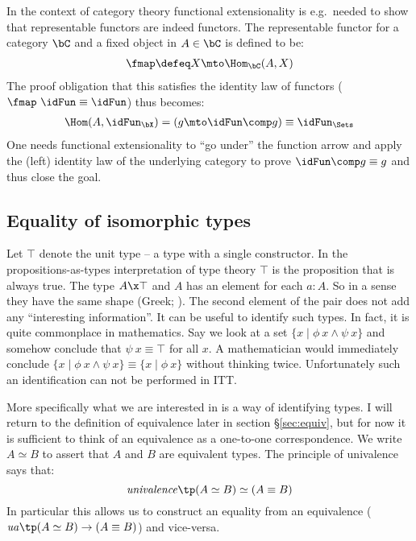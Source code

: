 In the context of category theory functional extensionality is e.g.\ needed to
show that representable functors are indeed functors. The representable functor
for a category $\bC$ and a fixed object in $A \in \bC$ is defined to be:
%
\begin{align*}
\fmap \defeq X \mto \Hom_{\bC}(A, X)
\end{align*}
%
The proof obligation that this satisfies the identity law of functors
($\fmap\ \idFun \equiv \idFun$) thus becomes:
%
\begin{align*}
\Hom(A, \idFun_{\bX}) = (g \mto \idFun \comp g) \equiv \idFun_{\Sets}
\end{align*}
%
One needs functional extensionality to ``go under'' the function arrow and apply
the (left) identity law of the underlying category to prove $\idFun \comp g
\equiv g$ and thus close the goal.
%
\subsection{Equality of isomorphic types}
%
Let $\top$ denote the unit type -- a type with a single constructor. In the
propositions-as-types interpretation of type theory $\top$ is the proposition
that is always true. The type $A \x \top$ and $A$ has an element for each $a :
A$. So in a sense they have the same shape (Greek; ). The
second element of the pair does not add any ``interesting information''. It can
be useful to identify such types. In fact, it is quite commonplace in
mathematics. Say we look at a set $\{x \mid \phi\ x \land \psi\ x\}$ and somehow
conclude that $\psi\ x \equiv \top$ for all $x$. A mathematician would
immediately conclude $\{x \mid \phi\ x \land \psi\ x\} \equiv \{x \mid
\phi\ x\}$ without thinking twice. Unfortunately such an identification can not
be performed in ITT.

More specifically what we are interested in is a way of identifying
 types. I will return to the definition of equivalence later
in section \S\ref{sec:equiv}, but for now it is sufficient to think of an
equivalence as a one-to-one correspondence. We write $A \simeq B$ to assert that
$A$ and $B$ are equivalent types. The principle of univalence says that:
%
$$\mathit{univalence} \tp (A \simeq B) \simeq (A \equiv B)$$
%
In particular this allows us to construct an equality from an equivalence
($\mathit{ua} \tp (A \simeq B) \to (A \equiv B)$) and vice-versa.


